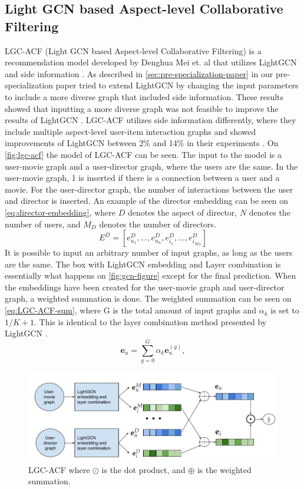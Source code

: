 \subsection{Light GCN based Aspect-level Collaborative Filtering}
LGC-ACF (Light GCN based Aspect-level Collaborative Filtering) is a recommendation model developed by Denghua Mei et. al that utilizes LightGCN and side information \cite{LGC-ACF}.
As described in \autoref{sec:pre-specialization-paper} in our pre-specialization paper tried to extend LightGCN by changing the input parameters to include a more diverse graph that included side information.
These results showed that inputting a more diverse graph was not feasible to improve the results of LightGCN \cite{Pre-specialisation}.
LGC-ACF utilizes side information differently, where they include multiple aspect-level user-item interaction graphs and showed improvements of LightGCN between 2\% and 14\% in their experiments \cite{LGC-ACF}.
On \autoref{fig:lgc-acf} the model of LGC-ACF can be seen.
The input to the model is a user-movie graph and a user-director graph, where the users are the same.
In the user-movie graph, 1 is inserted if there is a connection between a user and a movie.
For the user-director graph, the number of interactions between the user and director is inserted.
An example of the director embedding can be seen on \autoref{eq:director-embedding}, where $D$ denotes the aspect of director, $N$ denotes the number of users, and $M_D$ denotes the number of directors.
\begin{equation}
    E^D = [e_{u_1}^D, ... , e_{u_n}^D, e_{i_1}^D, ..., e_{i_{M_D}}^D]
    \label{eq:director-embedding}
\end{equation}
It is possible to input an arbitrary number of input graphs, as long as the users are the same.
The box with LightGCN embedding and Layer combination is essentially what happens on \autoref{fig:gcn-figure} except for the final prediction.
When the embeddings have been created for the user-movie graph and user-director graph, a weighted summation is done.
The weighted summation can be seen on \autoref{eq:LGC-ACF-sum}, where G is the total amount of input graphs and $\alpha_k$ is set to $1/K + 1$.
This is identical to the layer combination method presented by LightGCN \cite{lightgcn}.
\begin{equation}
    \mathbf{e}_u = \sum_{g=0}^{G} \alpha_k \mathbf{e}_u^{(g)},
    \label{eq:LGC-ACF-sum}
\end{equation}
\begin{figure}[h!]
    \includegraphics[width=1.1\textwidth]{figures/LGC-ACF.jpg}
    \centering
    \caption{LGC-ACF where $\odot$ is the dot product, and $\oplus$ is the weighted summation.}
    \label{fig:lgc-acf}
\end{figure}
